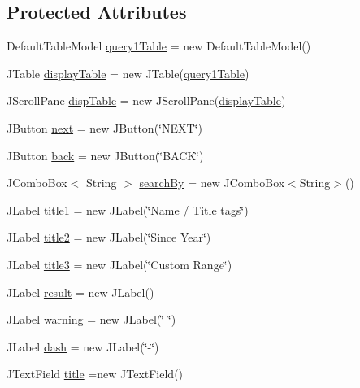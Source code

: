 \subsection*{Protected Attributes}
\begin{DoxyCompactItemize}
\item 
Default\+Table\+Model \hyperlink{classGuiQuery1_ab9463b1a4a59d6c13bc04963b2b3f2c2}{query1\+Table} = new Default\+Table\+Model()
\item 
J\+Table \hyperlink{classGuiQuery1_aa23b7fb33949ccf74ca5be46e85eb578}{display\+Table} = new J\+Table(\hyperlink{classGuiQuery1_ab9463b1a4a59d6c13bc04963b2b3f2c2}{query1\+Table})
\item 
J\+Scroll\+Pane \hyperlink{classGuiQuery1_aaa4f69c2faaffb0b451f1fa5bfebc4d3}{disp\+Table} = new J\+Scroll\+Pane(\hyperlink{classGuiQuery1_aa23b7fb33949ccf74ca5be46e85eb578}{display\+Table})
\item 
J\+Button \hyperlink{classGuiQuery1_a0ef1bc892139ef28ea2e6c464f78e881}{next} = new J\+Button(\char`\"{}N\+E\+XT\char`\"{})
\item 
J\+Button \hyperlink{classGuiQuery1_a2b884d6a7f21de2efe0640e21fe6aadd}{back} = new J\+Button(\char`\"{}B\+A\+CK\char`\"{})
\item 
J\+Combo\+Box$<$ String $>$ \hyperlink{classGuiQuery1_a021ae2f4fa2ec342496af6ac434995f4}{search\+By} = new J\+Combo\+Box$<$String$>$()
\item 
J\+Label \hyperlink{classGuiQuery1_a31e28191d4f156f0367a7dac29b65836}{title1} = new J\+Label(\char`\"{}Name / Title tags\char`\"{})
\item 
J\+Label \hyperlink{classGuiQuery1_ad120c79c1fe5e4b3ce09960942924c0d}{title2} = new J\+Label(\char`\"{}Since Year\char`\"{})
\item 
J\+Label \hyperlink{classGuiQuery1_a8e28412d9118fc61abde587c3bf7574f}{title3} = new J\+Label(\char`\"{}Custom Range\char`\"{})
\item 
J\+Label \hyperlink{classGuiQuery1_a80ba7c84c9af8294566e3c1f1787c4a3}{result} = new J\+Label()
\item 
J\+Label \hyperlink{classGuiQuery1_a382ff58e8c0283a69f6d88249b1fe496}{warning} = new J\+Label(\char`\"{} \char`\"{})
\item 
J\+Label \hyperlink{classGuiQuery1_a40b4913205157f6e39c46956654a11f2}{dash} = new J\+Label(\char`\"{}-\/\char`\"{})
\item 
J\+Text\+Field \hyperlink{classGuiQuery1_aeebb26c926dc7045d9bd99dd3568eb45}{title} =new J\+Text\+Field()
\item 

\end{DoxyCompactItemize}
